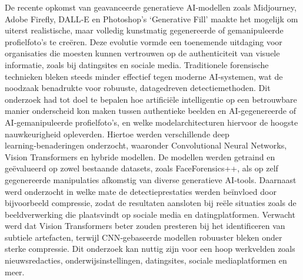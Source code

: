 De recente opkomst van geavanceerde generatieve AI‑modellen zoals Midjourney, Adobe Firefly, DALL‑E en Photoshop’s ‘Generative Fill’ maakte het mogelijk om uiterst realistische, maar volledig kunstmatig gegenereerde of gemanipuleerde profielfoto's te creëren. Deze evolutie vormde een toenemende uitdaging voor organisaties die moesten kunnen vertrouwen op de authenticiteit van visuele informatie, zoals bij datingsites en sociale media. Traditionele forensische technieken bleken steeds minder effectief tegen moderne AI‑systemen, wat de noodzaak benadrukte voor robuuste, datagedreven detectiemethoden. Dit onderzoek had tot doel te bepalen hoe artificiële intelligentie op een betrouwbare manier onderscheid kon maken tussen authentieke beelden en AI‑gegenereerde of AI‑gemanipuleerde profielfoto's, en welke modelarchitecturen hiervoor de hoogste nauwkeurigheid opleverden. Hiertoe werden verschillende deep learning‑benaderingen onderzocht, waaronder Convolutional Neural Networks, Vision Transformers en hybride modellen. De modellen werden getraind en geëvalueerd op zowel bestaande datasets, zoals FaceForensics++, als op zelf gegenereerde manipulaties afkomstig van diverse generatieve AI‑tools. Daarnaast werd onderzocht in welke mate de detectieprestaties werden beïnvloed door bijvoorbeeld compressie, zodat de resultaten aansloten bij reële situaties zoals de beeldverwerking die plaatsvindt op sociale media en datingplatformen. Verwacht werd dat Vision Transformers beter zouden presteren bij het identificeren van subtiele artefacten, terwijl CNN‑gebaseerde modellen robuuster bleken onder sterke compressie. Dit onderzoek kan nuttig zijn voor een hoop werkvelden zoals nieuwsredacties, onderwijsinstellingen, datingsites, sociale mediaplatformen en meer.
